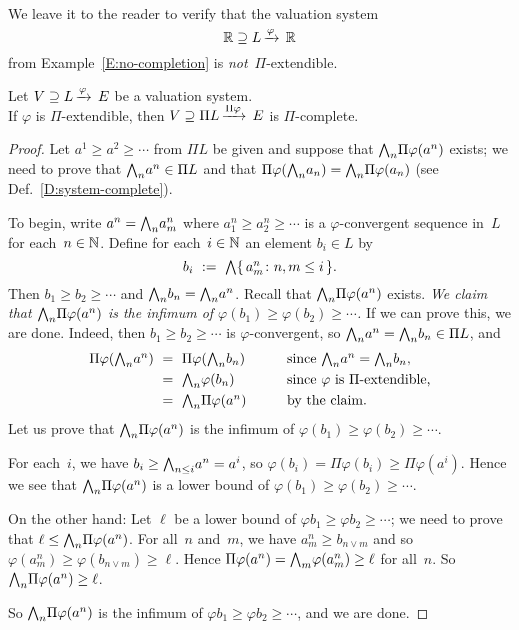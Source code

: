 \begin{ex}
We leave it to the reader
to verify
that the  valuation system
\begin{equation*}
\mathbb{R} \supseteq L\,\smash{\xrightarrow{\varphi}\,\mathbb{R}}
\end{equation*}
from Example~\ref{E:no-completion}
is \emph{not}~$\Pi$-extendible.
\end{ex}
%
%
\begin{lem}
\label{L:Pi-complete}
Let $V \supseteq L\,\smash{\xrightarrow{\varphi}\,E}$ be a valuation system.\\
If $\varphi$ is $\Pi$-extendible,
then $V \supseteq \Pi L\,\smash{\xrightarrow{\Pi\varphi}\,E}$ is $\Pi$-complete.
\end{lem}
\begin{proof}
Let $a^1 \geq a^2 \geq \dotsb $ from $\Pi L$
be given and suppose that $\textstyle{\bigwedge}_n \Pi \varphi (a^n)$ exists;
we need to prove that $\textstyle{\bigwedge}_n a^n \in \Pi L$
and that $\Pi\varphi(\textstyle{\bigwedge}_n a_n) = \textstyle{\bigwedge}_n \Pi \varphi(a_n )$
(see Def.~\ref{D:system-complete}).

To begin, write
$a^n = \textstyle{\bigwedge}_n a^n_m$
where $a^n_1 \geq a^n_2 \geq \dotsb$
is a $\varphi$-convergent sequence in~$L$
for each~$n\in\mathbb{N}$.
Define for each~$i\in\mathbb{N}$
an element $b_i \in L$ by
\begin{equation*}
b_i \ :=\ \textstyle{\bigwedge}\{\,a^n_m\colon n,m\leq i \,\}.
\end{equation*}
Then $b_1 \geq b_2 \geq \dotsb$
and $\textstyle{\bigwedge}_n b_n = \textstyle{\bigwedge}_n a^n$.
Recall that  $\textstyle{\bigwedge}_n \Pi\varphi(a^n)$
exists.
\emph{%
We claim that $\textstyle{\bigwedge}_n \Pi\varphi(a^n)$
is the infimum of $\varphi (b_1) \geq \varphi (b_2) \geq \dotsb$.%
}
If we can prove this, we are done.
Indeed,
then $b_1 \geq b_2 \geq\dotsb$ is $\varphi$-convergent,
so $\textstyle{\bigwedge}_n a^n = \textstyle{\bigwedge}_n b_n \in \Pi L$,
and
\begin{alignat*}{3}
\Pi\varphi( \textstyle{\bigwedge}_n a^n ) \ &=\  \Pi\varphi( \textstyle{\bigwedge}_n b_n )
 \qquad&& \text{since $\textstyle{\bigwedge}_n a^n = \textstyle{\bigwedge}_n b_n$}, \\
&=\ \textstyle{\bigwedge}_n \varphi (b_n)  
  && \text{since $\varphi$ is $\Pi$-extendible,}\\
&=\ \textstyle{\bigwedge}_n \Pi\varphi(a^n) 
  && \text{by the claim.}
\end{alignat*}
Let us prove that 
 $\textstyle{\bigwedge}_n \Pi\varphi(a^n)$
is the infimum of $\varphi (b_1) \geq \varphi (b_2) \geq \dotsb$.

For each~$i$,
we have $b_i \geq \textstyle{\bigwedge}_{n\leq i} a^n = a^i$,
so $\varphi(b_i) = \Pi\varphi(b_i) \geq \Pi\varphi(a^i)$.
Hence we see that
$\textstyle{\bigwedge}_n \Pi\varphi(a^n)$ is a lower bound of
$\varphi(b_1)\geq \varphi(b_2) \geq \dotsb$.

On the other hand:
Let $\ell$ be a lower bound of $\varphi b_1 \geq \varphi b_2 \geq \dotsb$;
we need to prove that $\ell \leq \textstyle{\bigwedge}_n \Pi\varphi(a^n)$.
For all~$n$ and~$m$,
we have $a_m^n \geq b_{n\vee m}$
and so $\varphi(a_m^n) \geq \varphi(b_{n\vee m}) \geq \ell$.
Hence $\Pi\varphi(a^n) = \textstyle{\bigwedge}_m \varphi(a_m^n) \geq \ell$
for all~$n$.
So $\textstyle{\bigwedge}_n \Pi\varphi(a^n) \geq \ell$.

So $\textstyle{\bigwedge}_n \Pi\varphi(a^n)$ is the infimum of 
$\varphi b_1 \geq \varphi b_2 \geq \dotsb$,
and we are done.
\end{proof}

